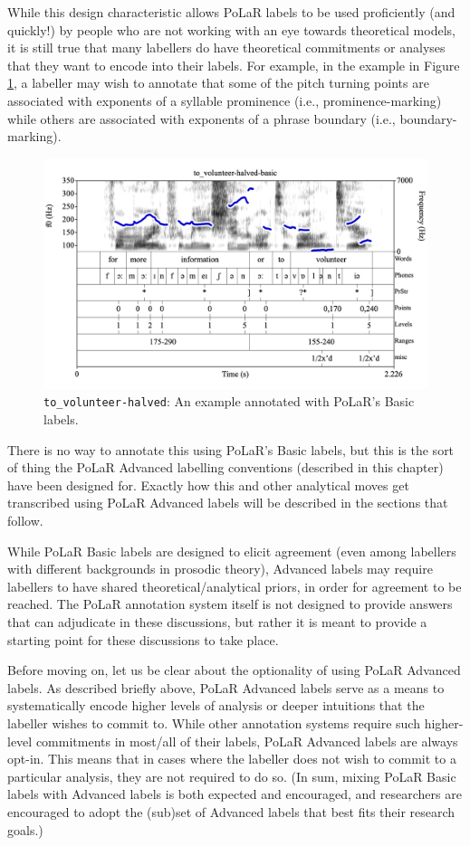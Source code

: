 \documentclass[11pt, twoside]{memoir}
\begin{document}
While this design characteristic allows PoLaR labels to be used proficiently (and quickly!) by people who are not working with an eye towards theoretical models, it is still true that many labellers do have theoretical commitments or analyses that they want to encode into their labels. For example, in the example in Figure \ref{fig:to volunteer-halved all basics}, a labeller may wish to annotate that some of the pitch turning points are associated with exponents of a syllable prominence (i.e., prominence-marking) while others are associated with exponents of a phrase boundary (i.e., boundary-marking).

\begin{figure}[H]
\centering
%
\includegraphics[width=.875\linewidth]{Appendix-to_volunteer-halved.png}
%
\caption{\texttt{to\_volunteer-halved}: An example annotated with PoLaR’s Basic labels.%
\label{fig:to volunteer-halved all basics}%
}
\end{figure}

There is no way to annotate this using PoLaR’s Basic labels, but this is the sort of thing the PoLaR Advanced labelling conventions (described in this chapter) have been designed for. Exactly how this and other analytical moves get transcribed using PoLaR Advanced labels will be described in the sections that follow.

While PoLaR Basic labels are designed to elicit agreement (even among labellers with different backgrounds in prosodic theory), Advanced labels may require labellers to have shared theoretical\slash analytical priors, in order for agreement to be reached. The PoLaR annotation system itself is not designed to provide answers that can adjudicate in these discussions, but rather it is meant to provide a starting point for these discussions to take place.

Before moving on, let us be clear about the optionality of using PoLaR Advanced labels. As described briefly above, PoLaR Advanced labels serve as a means to systematically encode higher levels of analysis or deeper intuitions that the labeller wishes to commit to. While other annotation systems require such higher-level commitments in most\slash all of their labels, PoLaR Advanced labels are always opt-in. This means that in cases where the labeller does not wish to commit to a particular analysis, they are not required to do so. (In sum, mixing PoLaR Basic labels with Advanced labels is both expected and encouraged, and researchers are encouraged to adopt the (sub)set of Advanced labels that best fits their research goals.)
\end{document}
